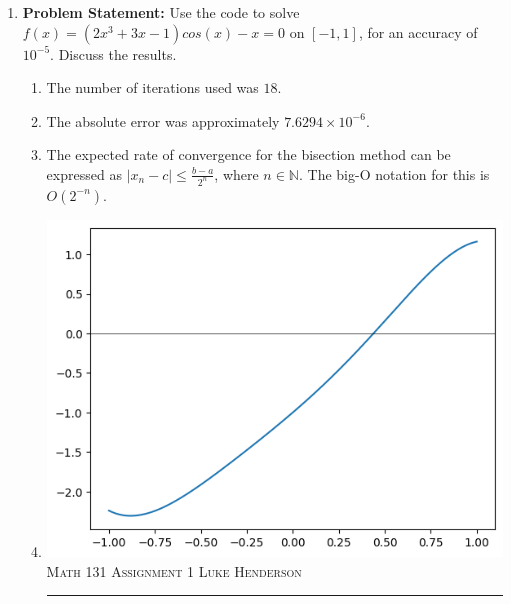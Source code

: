 \documentclass[12pt]{amsart}
\begin{document}
\begin{enumerate}
\begin{enumerate}
    \addtocounter{enumii}{2}
    \item\textbf{Problem Statement:} Use the code to solve $f(x) = (2x^3 + 3x - 1)cos(x) - x = 0$ on $[-1, 1]$, for an accuracy of $10^{-5}$. Discuss the results.
    \begin{enumerate}
        \item The number of iterations used was $18$.
        \item The absolute error was approximately $7.6294 \times 10^{-6}$.
        \item The expected rate of convergence for the bisection method can be expressed as $|x_n - c| \leq \frac{b - a}{2^n}$, where $n \in \mathbb{N}$. The big-O notation for this is $O(2^{-n})$.
        \item\begin{multicols}{2}
            
        \columnbreak
            
        \end{multicols}
        \includegraphics[scale=0.85]{../img/problem4civ.png} \\

\newpage
{\scshape Math 131} \hfill {\scshape \large Assignment 1} \hfill {\scshape Luke Henderson}
\smallskip
\hrule
\bigskip


\end{enumerate}
\end{enumerate}
\end{enumerate}
\end{document}
